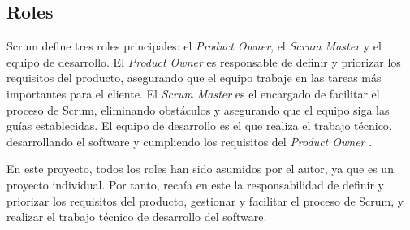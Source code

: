 
\subsection{Roles}
\label{anexo3:subsec:roles}
Scrum define tres roles principales: el \textit{Product Owner}, el \textit{Scrum Master} y el equipo de desarrollo.
El \textit{Product Owner} es responsable de definir y priorizar los requisitos del producto, asegurando
que el equipo trabaje en las tareas más importantes para el cliente. El \textit{Scrum Master} es el encargado
de facilitar el proceso de Scrum, eliminando obstáculos y asegurando que el equipo siga las guías
establecidas. El equipo de desarrollo es el que realiza el trabajo técnico, desarrollando el software
y cumpliendo los requisitos del \textit{Product Owner} \parencite{schwaber2020scrum}.

En este proyecto, todos los roles han sido asumidos por el autor, ya que es un proyecto individual.
Por tanto, recaía en este la responsabilidad de definir y priorizar los requisitos del producto,
gestionar y facilitar el proceso de Scrum, y realizar el trabajo técnico de desarrollo del software.


